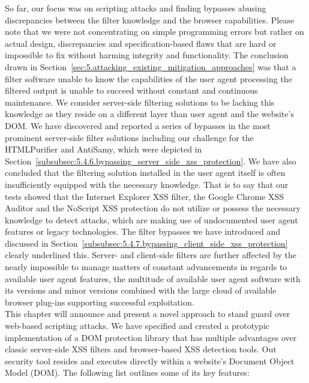   So far, our focus was on scripting attacks and finding bypasses abusing discrepancies between the filter knowledge and the browser capabilities. Please note that we were not concentrating on simple programming errors but rather on actual design, discrepancies and specification-based flaws that are hard or impossible to fix without harming integrity and functionality. The conclusion drawn in Section~\ref{sec:5.attacking_existing_mitigation_approaches} was that a filter software unable to know the capabilities of the user agent processing the filtered output is unable to succeed without constant and continuous maintenance. We consider server-side filtering solutions to be lacking this knowledge as they reside on a different layer than  user agent and the website's DOM. We have discovered and reported a series of bypasses in the most prominent server-side filter solutions including our challenge for the HTMLPurifier and AntiSamy, which were depicted in Section~\ref{subsubsec:5.4.6.bypassing_server_side_xss_protection}. We have also concluded that the filtering solution installed in the user agent itself is often insufficiently equipped with the necessary knowledge. That is to say that our tests showed that the Internet Explorer XSS filter, the Google Chrome XSS Auditor and the NoScript XSS protection do not utilize or possess the necessary knowledge to detect attacks, which are making use of undocumented user agent features or legacy technologies. The filter bypasses we have introduced and discussed in Section~\ref{subsubsec:5.4.7.bypassing_client_side_xss_protection} clearly underlined this. Server- and client-side filters are further affected by the nearly impossible to manage matters of constant advancements in regards to available user agent features, the multitude of available user agent software with its versions and minor versions combined with the large cloud of available browser plug-ins supporting successful exploitation.\\

  This chapter will announce and present a novel approach to stand guard over web-based scripting attacks. We have specified and created a prototypic implementation of a DOM protection library that has multiple advantages over classic server-side XSS filters and browser-based XSS detection tools. Out security tool resides and executes directly within a website's Document Object Model (DOM). The following list outlines some of its key features: 

